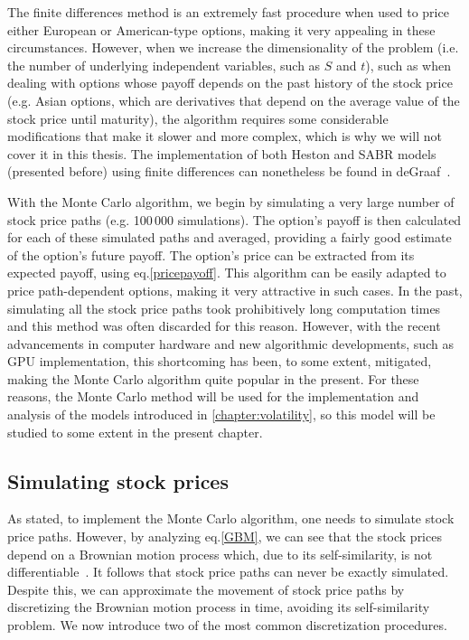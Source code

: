 The finite differences method is an extremely fast procedure when used to price either European or American-type options, making it very appealing in these circumstances. However, when we increase the dimensionality of the problem (i.e. the number of underlying independent variables, such as $S$ and $t$), such as when dealing with options whose payoff depends on the past history of the stock price (e.g. Asian options, which are derivatives that depend on the average value of the stock price until maturity), the algorithm requires some considerable modifications that make it slower and more complex, which is why we will not cover it in this thesis.
The implementation of both Heston and SABR models (presented before) using finite differences can nonetheless be found in deGraaf~\citep{deGraaf}.


With the Monte Carlo algorithm, we begin by simulating a very large number of stock price paths (e.g. 100\,000 simulations). The option's payoff is then calculated for each of these simulated paths and averaged, providing a fairly good estimate of the option's future payoff. The option's price can be extracted from its expected payoff, using eq.\eqref{pricepayoff}. This algorithm can be easily adapted to price path-dependent options, making it very attractive in such cases.
In the past, simulating all the stock price paths took prohibitively long computation times and this method was often discarded for this reason. However, with the recent advancements in computer hardware and new algorithmic developments, such as GPU implementation, this shortcoming has been, to some extent, mitigated, making the Monte Carlo algorithm quite popular in the present.
For these reasons, the Monte Carlo method will be used for the implementation and analysis of the models introduced in \autoref{chapter:volatility}, so this model will be studied to some extent in the present chapter.


\subsection{Simulating stock prices}
\label{subsection:Simulating stock prices}
As stated, to implement the Monte Carlo algorithm, one needs to simulate stock price paths. However, by analyzing eq.\eqref{GBM}, we can see that the stock prices depend on a Brownian motion process which, due to its self-similarity, is not differentiable~\citep{Mikosch}. It follows that stock price paths can never be exactly simulated. Despite this, we can approximate the movement of stock price paths by discretizing the Brownian motion process in time, avoiding its self-similarity problem. We now introduce two of the most common discretization procedures.

